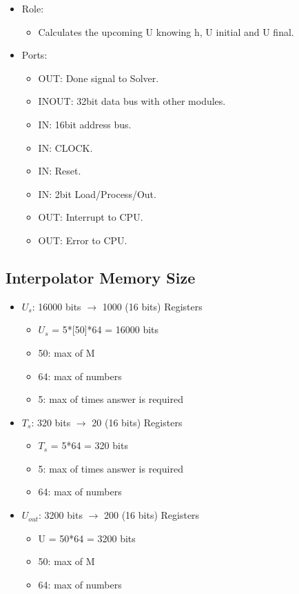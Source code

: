 \documentclass[12pt]{report}
\begin{document}
\begin{itemize}
    \item Role:
    \begin{itemize}
        \item Calculates the upcoming U knowing h, U initial and U final.
    \end{itemize}
    \item Ports:
    \begin{itemize}
        \item OUT: Done signal to Solver.
        \item INOUT: 32bit data bus with other modules.
        \item IN: 16bit address bus.
        \item IN: CLOCK.
        \item IN: Reset.
        \item IN: 2bit Load/Process/Out.
        \item OUT: Interrupt to CPU.
        \item OUT: Error to CPU.
    \end{itemize}
\end{itemize}

\subsection{Interpolator Memory Size}
\begin{itemize}
    \item $U_s$: 16000 bits $\rightarrow$ 1000 (16 bits) Registers
    \begin{itemize}
        \item $U_s$ = 5*[50]*64 = 16000 bits
        \item 50: max of M
        \item 64: max of numbers
        \item 5: max of times answer is required
    \end{itemize}
    \item $T_s$: 320 bits $\rightarrow$ 20 (16 bits) Registers
    \begin{itemize}
        \item $T_s$ = 5*64 = 320 bits
        \item 5: max of times answer is required
        \item 64: max of numbers
    \end{itemize}
    \item $U_{out}$: 3200 bits $\rightarrow$ 200 (16 bits) Registers
    \begin{itemize}
        \item U = 50*64 = 3200 bits
        \item 50: max of M
        \item 64: max of numbers
    \end{itemize}
\end{itemize}
\end{document}
